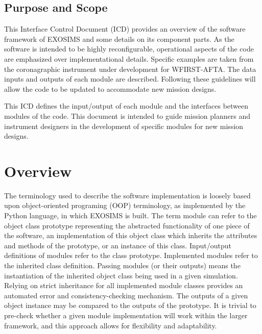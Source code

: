 \documentclass[cleanfoot]{asme2ej}
\begin{document}
\subsection{Purpose and Scope} %
This Interface Control Document (ICD) provides an overview of the software framework of EXOSIMS and some details on its component parts.  As the software is intended to be highly reconfigurable, operational aspects of the code are emphasized over implementational details.  Specific examples are taken from the coronagraphic instrument under development for WFIRST-AFTA.  The data inputs and outputs of each module are described. Following these guidelines will allow the code to be updated to accommodate new mission designs.

This ICD defines the input/output of each module and the interfaces between modules of the code.  This document is intended to guide mission planners and instrument designers in the development of specific modules for new mission designs.


\section{Overview}
The terminology used to describe the software implementation is loosely based upon object-oriented programing (OOP) terminology, as implemented by the Python language, in which EXOSIMS is built.  The term module can refer to the object class prototype representing the abstracted functionality of one piece of the software, an implementation of this object class which inherits the attributes and methods of the prototype, or an instance of this class.  Input/output definitions of modules refer to the class prototype.  Implemented modules refer to the inherited class definition.  Passing modules (or their outputs) means the instantiation of the inherited object class being used in a given simulation.  Relying on strict inheritance for all implemented module classes provides an automated error and consistency-checking mechanism.  The outputs of a given object instance may be compared to the outputs of the prototype.  It is trivial to pre-check whether a given module implementation will work within the larger framework, and this approach allows for flexibility and adaptability.
\end{document}
